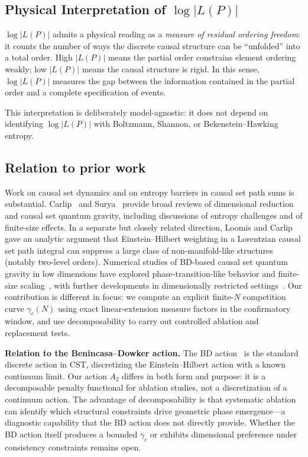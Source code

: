 \documentclass[12pt,a4paper]{article}
\begin{document}
\subsection{Physical Interpretation of $\log|L(P)|$}

$\log|L(P)|$ admits a physical reading as a \emph{measure of residual ordering
freedom}: it counts the number of ways the discrete causal structure can be
``unfolded'' into a total order. High $|L(P)|$ means the partial order
constrains element ordering weakly; low $|L(P)|$ means the causal structure is
rigid. In this sense, $\log|L(P)|$ measures the gap between the information
contained in the partial order and a complete specification of events.

This interpretation is deliberately model-agnostic: it does not depend on
identifying $\log|L(P)|$ with Boltzmann, Shannon, or Bekenstein--Hawking
entropy.

\subsection{Relation to prior work}

Work on causal set dynamics and on entropy barriers in causal set path sums is
substantial. Carlip~\cite{carlip2017} and Surya~\cite{surya2019} provide broad
reviews of dimensional reduction and causal set quantum gravity, including
discussions of entropy challenges and of finite-size effects. In a separate but
closely related direction, Loomis and Carlip~\cite{loomis2018} gave an analytic
argument that Einstein--Hilbert weighting in a Lorentzian causal set path
integral can suppress a large class of non-manifold-like structures (notably
two-level orders). Numerical studies of BD-based causal set quantum gravity in
low dimensions have explored phase-transition-like behavior and finite-size
scaling~\cite{surya2012,glaser2018}, with further developments in
dimensionally restricted settings~\cite{cunningham2020}. Our contribution is
different in focus: we compute an explicit finite-$N$ competition curve
$\gamma_c(N)$ using exact linear-extension measure factors in the confirmatory
window, and use decomposability to carry out controlled ablation and
replacement tests.

\textbf{Relation to the Benincasa--Dowker action.}
The BD action~\cite{benincasa2010,benincasa2011} is the standard discrete action
in CST, discretizing the Einstein--Hilbert action with a known continuum limit.
Our action $A_2$ differs in both form and purpose: it is a decomposable penalty
functional for ablation studies, not a discretization of a continuum action. The
advantage of decomposability is that systematic ablation can identify which
structural constraints drive geometric phase emergence---a diagnostic capability
that the BD action does not directly provide. Whether the BD action itself
produces a bounded $\gamma_c$ or exhibits dimensional preference under
consistency constraints remains open.
\end{document}
